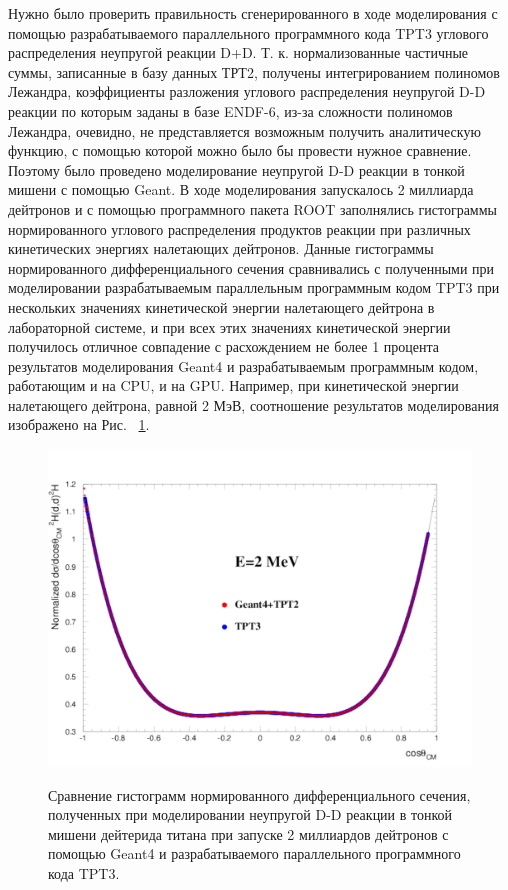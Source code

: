 \documentclass[a4paper,12pt]{article}
\begin{document}
\begin{large}
	Нужно было проверить правильность сгенерированного в ходе моделирования с помощью разрабатываемого параллельного программного кода TPT3 углового распределения неупругой реакции D+D. Т. к. нормализованные частичные суммы, записанные в базу данных ТРТ2, получены интегрированием полиномов Лежандра, коэффициенты разложения углового распределения неупругой D-D реакции по которым заданы в базе ENDF-6, из-за сложности полиномов Лежандра, очевидно, не представляется возможным получить аналитическую функцию, с помощью которой можно было бы провести нужное сравнение. Поэтому было проведено моделирование неупругой D-D реакции в тонкой мишени с помощью Geant. В ходе моделирования запускалось 2 миллиарда дейтронов и с помощью программного пакета ROOT заполнялись гистограммы нормированного углового распределения продуктов реакции при различных кинетических энергиях налетающих дейтронов. Данные гистограммы нормированного дифференциального сечения сравнивались с полученными при моделировании разрабатываемым параллельным программным кодом TPT3 при нескольких значениях кинетической энергии налетающего дейтрона в лабораторной системе, и при всех этих значениях кинетической энергии получилось отличное совпадение с расхождением не более 1 процента результатов моделирования Geant4 и разрабатываемым программным кодом, работающим и на CPU, и на GPU. Например, при кинетической энергии налетающего дейтрона, равной 2 МэВ, соотношение результатов моделирования изображено на  Рис. ~\ref{fig:ValidationThermonuclear2mev2billionParticles}.
	
\begin{figure}[ht]
  {
     \includegraphics[width=0.99\linewidth]{images/validation_thermonuclear_2mev_2billion.pdf}
  }
  \caption{Сравнение гистограмм нормированного дифференциального сечения, полученных при моделировании неупругой D-D реакции в тонкой мишени дейтерида титана при запуске 2 миллиардов дейтронов с помощью Geant4 и разрабатываемого параллельного программного кода TPT3.}
  \label{fig:ValidationThermonuclear2mev2billionParticles}
\end{figure}	
	

\end{large}
\end{document}
